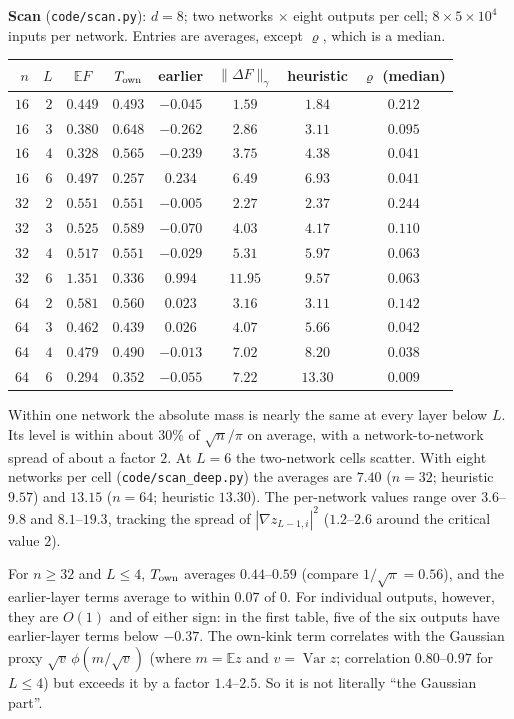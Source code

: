 \documentclass[11pt]{article}
\theoremstyle{definition}
\theoremstyle{remark}
\newcommand{\E}{\mathbb E}
\newcommand{\Var}{\operatorname{Var}}
\begin{document}
\textbf{Scan} (\texttt{code/scan.py}): $d=8$; two networks $\times$ eight outputs per cell; $8\times5\times10^4$ inputs per network. Entries are averages, except $\varrho$, which is a median.
\begin{center}\small
\begin{tabular}{rrcccccc}
\toprule
$n$ & $L$ & $\E F$ & $T_{\rm own}$ & earlier & $\|\Delta F\|_\gamma$ & heuristic & $\varrho$ (median)\\
\midrule
$16$ & $2$ & $0.449$ & $0.493$ & $-0.045$ & $1.59$ & $1.84$ & $0.212$\\
$16$ & $3$ & $0.380$ & $0.648$ & $-0.262$ & $2.86$ & $3.11$ & $0.095$\\
$16$ & $4$ & $0.328$ & $0.565$ & $-0.239$ & $3.75$ & $4.38$ & $0.041$\\
$16$ & $6$ & $0.497$ & $0.257$ & $0.234$ & $6.49$ & $6.93$ & $0.041$\\
$32$ & $2$ & $0.551$ & $0.551$ & $-0.005$ & $2.27$ & $2.37$ & $0.244$\\
$32$ & $3$ & $0.525$ & $0.589$ & $-0.070$ & $4.03$ & $4.17$ & $0.110$\\
$32$ & $4$ & $0.517$ & $0.551$ & $-0.029$ & $5.31$ & $5.97$ & $0.063$\\
$32$ & $6$ & $1.351$ & $0.336$ & $0.994$ & $11.95$ & $9.57$ & $0.063$\\
$64$ & $2$ & $0.581$ & $0.560$ & $0.023$ & $3.16$ & $3.11$ & $0.142$\\
$64$ & $3$ & $0.462$ & $0.439$ & $0.026$ & $4.07$ & $5.66$ & $0.042$\\
$64$ & $4$ & $0.479$ & $0.490$ & $-0.013$ & $7.02$ & $8.20$ & $0.038$\\
$64$ & $6$ & $0.294$ & $0.352$ & $-0.055$ & $7.22$ & $13.30$ & $0.009$\\
\bottomrule
\end{tabular}
\end{center}
Within one network the absolute mass is nearly the same at every layer below $L$. Its level is within about $30\%$ of $\sqrt n/\pi$ on average, with a network-to-network spread of about a factor $2$. At $L=6$ the two-network cells scatter. With eight networks per cell (\texttt{code/scan\_deep.py}) the averages are $7.40$ ($n=32$; heuristic $9.57$) and $13.15$ ($n=64$; heuristic $13.30$). The per-network values range over $3.6$--$9.8$ and $8.1$--$19.3$, tracking the spread of $|\nabla z_{L-1,i}|^2$ ($1.2$--$2.6$ around the critical value $2$).

For $n\ge32$ and $L\le4$, $T_{\rm own}$ averages $0.44$--$0.59$ (compare $1/\sqrt\pi=0.56$), and the earlier-layer terms average to within $0.07$ of $0$. For individual outputs, however, they are $O(1)$ and of either sign: in the first table, five of the six outputs have earlier-layer terms below $-0.37$. The own-kink term correlates with the Gaussian proxy $\sqrt v\,\phi(m/\sqrt v)$ (where $m=\E z$ and $v=\Var z$; correlation $0.80$--$0.97$ for $L\le4$) but exceeds it by a factor $1.4$--$2.5$. So it is not literally ``the Gaussian part''.
\end{document}
